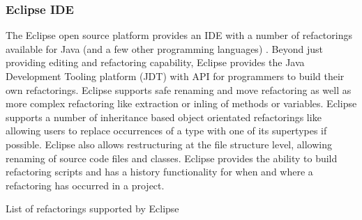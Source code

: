 \subsubsection{Eclipse IDE}
The Eclipse open source platform provides an IDE with a number of refactorings available for Java (and a few other programming languages) \cite{widmer07}. Beyond just providing editing and refactoring capability, Eclipse provides the Java Development Tooling platform (JDT) with API for programmers to build their own refactorings. Eclipse supports safe renaming and move refactoring as well as more complex refactoring like extraction or inling of methods or variables. Eclipse supports a number of inheritance based object orientated refactorings like allowing users to replace occurrences of a type with one of its supertypes if possible. Eclipse also allows restructuring at the file structure level, allowing renaming of source code files and classes. Eclipse provides the ability to build refactoring scripts and has a history functionality for when and where a refactoring has occurred in a project. 


\begin{center}
\begin{fig}
\caption{List of refactorings supported by Eclipse}
\label{Fig:eclipse}
\end{fig}
\end{center}

